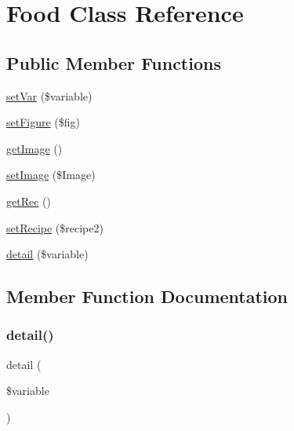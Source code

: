 \hypertarget{class_food}{}\section{Food Class Reference}
\label{class_food}
\subsection*{Public Member Functions}
\begin{DoxyCompactItemize}
\item 
\mbox{\hyperlink{class_food_a7a4815360caa28b9dd57e867b8c24134}{set\+Var}} (\$variable)
\item 
\mbox{\hyperlink{class_food_a369dc5ef69d748e8ff2c8164be651f93}{set\+Figure}} (\$fig)
\item 
\mbox{\hyperlink{class_food_a2af8add37797384585cae101fb8cbfe7}{get\+Image}} ()
\item 
\mbox{\hyperlink{class_food_a10f28e97c10ba7f766a5c88c2608795e}{set\+Image}} (\$Image)
\item 
\mbox{\hyperlink{class_food_ad05c558a85e707c2fabf068416a38be3}{get\+Rec}} ()
\item 
\mbox{\hyperlink{class_food_add8836563dee7d1e0a68cea374f2446f}{set\+Recipe}} (\$recipe2)
\item 
\mbox{\hyperlink{class_food_a6c5d100d3beccfae5646d3d481a156ed}{detail}} (\$variable)
\end{DoxyCompactItemize}


\subsection{Member Function Documentation}
\mbox{\label{class_food_a6c5d100d3beccfae5646d3d481a156ed}} 
\subsubsection{\texorpdfstring{detail()}{detail()}}
{\footnotesize\ttfamily detail (\begin{DoxyParamCaption}\item[{}]{\$variable }\end{DoxyParamCaption})}

\mbox{\label{class_food_a2af8add37797384585cae101fb8cbfe7}} 
